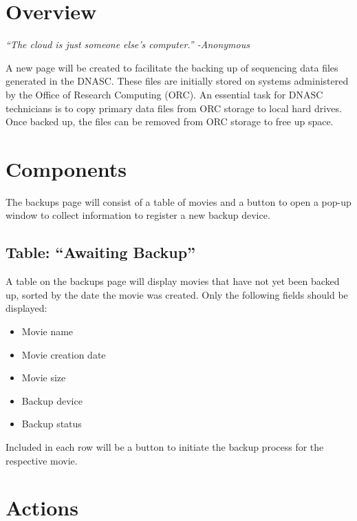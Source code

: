 
\section{Overview}

\vspace{3mm}
\emph{``The cloud is just someone else's computer.'' -Anonymous}
\vspace{3mm}

A new page will be created to facilitate the backing up of sequencing data 
files generated in the DNASC. These files are initially stored on systems 
administered by the Office of Research Computing (ORC). An essential task 
for DNASC technicians is to copy primary data files from ORC storage to local 
hard drives. Once backed up, the files can be removed from ORC storage to 
free up space.

\section{Components}

The backups page will consist of a table of movies and a button to open a
pop-up window to collect information to register a new backup device. 

\subsection{Table: ``Awaiting Backup''}

A table on the backups page will display movies that have not yet been backed
up, sorted by the date the movie was created. Only the following fields should 
be displayed:

\begin{itemize}\itemsep1pt
    \item Movie name
    \item Movie creation date
    \item Movie size
    \item Backup device
    \item Backup status
\end{itemize}

\noindent Included in each row will be a button to initiate the backup process
for the respective movie.

\section{Actions}

